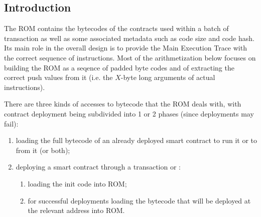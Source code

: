 \subsection{Introduction}

The ROM contains the bytecodes of the contracts used within a batch of transaction as well as some associated metadata such as code size and code hash. Its main role in the overall design is to provide the Main Execution Trace with the correct sequence of instructions. Most of the arithmetization below focuses on building the ROM as a seqence of padded byte codes and of extracting the correct push values from it (i.e. the $X$-byte long arguments of actual  instructions).

There are three kinds of accesses to bytecode that the ROM deals with, with contract deployment being subdivided into 1 or 2 phases (since deployments may fail):
\begin{enumerate}
    \item loading the full bytecode of an already deployed smart contract to run it or to  from it (or both);
    \item deploying a smart contract through a transaction or :
    \begin{enumerate}
        \item loading the init code into ROM;
        \item for successful deployments loading the bytecode that will be deployed at the relevant address into ROM.
    \end{enumerate}
\end{enumerate}
\iffalse
\begin{enumerate}
    \item the bytecodes of contracts whose bytecode is executed,
    \item the initcodes of contract deployment (both through a deployment transaction and by means of \inst{CREATE} and \inst{CREATE2} instructions), whether deployment is successful or not,
    \item the deployed bytecodes of contracts created during the transaction (regardless of whether it gets executed or not in that same transaction),
    \item the bytecodes read through \inst{EXTCODECOPY}.
\end{enumerate}
The overarching proof system must check that the loaded bytecodes match the originally deployed bytecode. This requires hashing the bytecode and comparing it to the codehash found in the matching account. This validates the claimed codehash, codesize and the bytecode itself.

But the ROM also contains small fragments of information about bytecodes that were accessed without being executed, i.e.
\begin{enumerate}
    \item smart contracts whose bytecode was indirectly accessed through \inst{EXTCODEHASH} and \inst{EXTCODESIZE}. 
\end{enumerate}
\fi
